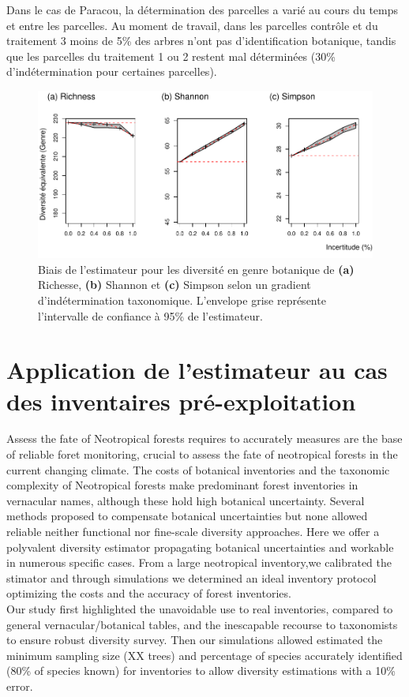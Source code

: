 \documentclass[
  11pt,
  french,
  A4paper,
  extrafontsizes,onecolumn,openright
  ]{memoir}
\begin{document}
Dans le cas de Paracou, la détermination des parcelles a varié au cours
du temps et entre les parcelles. Au moment de travail, dans les
parcelles contrôle et du traitement 3 moins de 5\% des arbres n'ont pas
d'identification botanique, tandis que les parcelles du traitement 1 ou
2 restent mal déterminées (30\% d'indétermination pour certaines
parcelles).

\begin{figure}

{\centering \includegraphics[width=0.6\linewidth]{Manuscript_files/figure-latex/FigTreesGenus-1} 

}

\caption{Biais de l'estimateur pour les diversité en genre botanique de \textbf{(a)} Richesse, \textbf{(b)} Shannon et \textbf{(c)} Simpson selon un gradient d'indétermination taxonomique. L'envelope grise représente l'intervalle de confiance à 95\% de l'estimateur.}\label{fig:FigTreesGenus}
\end{figure}

\section{Application de l'estimateur au cas des inventaires
pré-exploitation}\label{application-de-lestimateur-au-cas-des-inventaires-pre-exploitation}

Assess the fate of Neotropical forests requires to accurately measures
are the base of reliable foret monitoring, crucial to assess the fate of
neotropical forests in the current changing climate. The costs of
botanical inventories and the taxonomic complexity of Neotropical
forests make predominant forest inventories in vernacular names,
although these hold high botanical uncertainty. Several methods proposed
to compensate botanical uncertainties but none allowed reliable neither
functional nor fine-scale diversity approaches. Here we offer a
polyvalent diversity estimator propagating botanical uncertainties and
workable in numerous specific cases. From a large neotropical
inventory,we calibrated the stimator and through simulations we
determined an ideal inventory protocol optimizing the costs and the
accuracy of forest inventories.\\
Our study first highlighted the unavoidable use to real inventories,
compared to general vernacular/botanical tables, and the inescapable
recourse to taxonomists to ensure robust diversity survey. Then our
simulations allowed estimated the minimum sampling size (XX trees) and
percentage of species accurately identified (80\% of species known) for
inventories to allow diversity estimations with a 10\% error.
\end{document}
